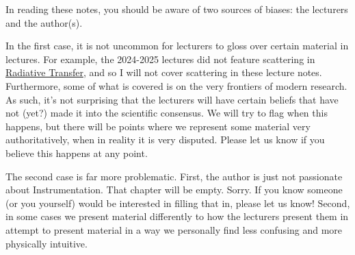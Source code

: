 \documentclass[a4paper,11pt,twoside]{report}
\begin{document}
\begin{sloppypar}
\begin{comment}
  Despite the vast diversity in C5, there are a few common themes (which are by no means unique to C5) that pop up throughout the course. I'll try to flag them clearly so that the reader can hopefully experience some kind of continuity when studying this course.  I have in mind three key themes:
  \begin{enumerate}
      \item The Role of \textbf{Scales}: The atmospheres and oceans are complex systems consisting of various phenomena on multiple spatio-temporal scales. At times we will exploit this by either a) noting empirical facts regarding the spatio-temporal scale of a phenomenon, or b) specifying a spatio-temporal scale to focus on a phenomenon.
      \item The Role of \textbf{Assumptions}: We'll make many assumptions throughout this course to simplify and solve the equations governing the phenomena under consideration. It's worth always keeping in mind the validity of this assumption, and why we make it. Sometimes, we make an assumptions simply for teaching purposes: real climate models numerically integrate this. Other times, the assumption. Sometimes assumptions are valid not simply due to luck but due to dynamical reasons that force it to be the case.
      \item A 3rd theme idk lol:
  \end{enumerate}
\end{comment}

In reading these notes, you should be aware of two sources of biases: the lecturers and the author(s).

In the first case, it is not uncommon for lecturers to gloss over certain material in lectures. For example, the 2024-2025 lectures did not feature scattering in \hyperref[Radiative Transfer]{Radiative Transfer}, and so I will not cover scattering in these lecture notes. Furthermore, some of what is covered is on the very frontiers of modern research. As such, it's not surprising that the lecturers will have certain beliefs that have not (yet?) made it into the scientific consensus. We will try to flag when this happens, but there will be points where we represent some material very authoritatively, when in reality it is very disputed. Please let us know if you believe this happens at any point.

The second case is far more problematic. First, the author is just not passionate about Instrumentation. That chapter will be empty. Sorry. If you know someone (or you yourself) would be interested in filling that in, please let us know! Second, in some cases we present material differently to how the lecturers present them in attempt to present material in a way we personally find less confusing and more physically intuitive.


\end{sloppypar}
\end{document}
